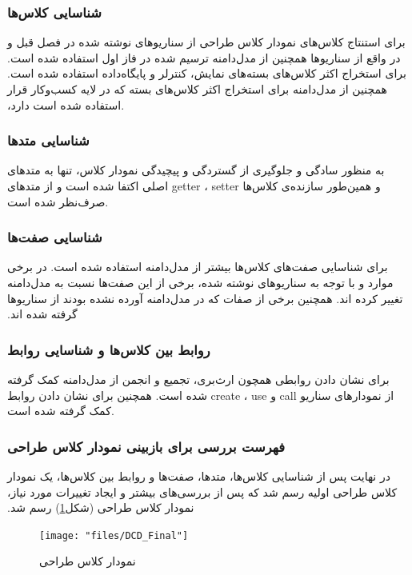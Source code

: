 \documentclass[12pt]{article}
\begin{document}
	\subsubsection{شناسایی کلاس‌ها}
	‫برای ‬‫استنتاج‬ ‫کلاس‬‌های‬‫ نمودار‬ ‫کلاس‬ ‫طراحی‬ ‫از‬ ‫سناریوهای‬ ‫نوشته‬ ‫شده‬ ‫در‬ ‫فصل‬ ‫قبل‬ ‫و‬ ‫همچنین‬ ‫از‬ ‫مدل‬‌‫دامنه ‬‫ترسیم‬ ‫شده‬ ‫در‬ ‫فاز‬ ‫اول‬ ‫استفاده‬ ‫شده‬ ‫است‪.‬‬ ‫در واقع‬ ‫از‬ ‫سناریوها‬ ‫برای‬ ‫استخراج‬ ‫اکثر‬ ‫کلاس‌های ‬‫بسته‬‌‫های‬ ‫نمایش‪،‬‬‫ کنترلر‬ ‫و‬ ‫پایگاه‌داده‬ ‫استفاده‬ ‫شده‬ ‫است‪.‬‬ ‫همچنین‬ ‫از‬ ‫مدل‬‌‫دامنه‬ ‫برای‬ ‫استخراج‬ ‫اکثر‬ کلاس‌های ‬‫بسته‬
	‫که‬‫ در‬ ‫لایه‬ ‫کسب‌و‬کار‬ ‫قرار‬ ‫دارد‪،‬‬ ‫استفاده‬ ‫شده‬ ‫است‬.
	\subsubsection{شناسایی متدها}
	به منظور سادگی و جلوگیری از گستردگی و پیچیدگی نمودار کلاس، تنها به متدهای اصلی اکتفا شده است و از متدهای
	getter ،
	setter
	و همین‌طور سازنده‌ی کلاس‌ها صرف‌نظر شده است.
	\subsubsection{شناسایی صفت‌ها}
	‫برای ‬‫شناسایی‬ ‫صفت‌های‬ ‫کلاس‌ها‬‫ بیشتر‬ ‫از‬ ‫مدل‌‫دامنه‬ ‫استفاده‬ ‫شده‬ ‫است‪.‬‬ ‫در‬ ‫برخی‬ ‫موارد‬ ‫و‬ ‫با‬ ‫توجه‬ ‫به سناریوهای ‬‫نوشته‬ ‫شده، برخی‬ ‫از‬ ‫این‬ ‫صفت‬‌‫ها ‬‫نسبت‬ ‫به‬ ‫مدل‬‌‫دامنه‬ ‫تغییر‬ ‫کرده‬ ‫اند‪.‬‬‫ همچنین‬ ‫برخی‬ ‫از‬ ‫صفات‬ که ‬‫در‬ ‫مدل‬‌‫دامنه‬ ‫آورده‬ ‫نشده‬ ‫بودند‬ ‫از‬ ‫سناریوها‬ ‫گرفته‬ ‫شده‬ ‫اند‬‫‪.‬‬
	\subsubsection{روابط بین کلاس‌ها و شناسایی روابط}
	برای نشان دادن روابطی همچون ارث‌بری، تجمیع و انجمن از مدل‌دامنه کمک گرفته شده است. همچنین برای نشان دادن روابط create ، use و call از نمودارهای سناریو کمک گرفته شده است.
	\subsubsection{فهرست بررسی برای بازبینی نمودار کلاس طراحی}
	در‬‫ نهایت‬ ‫پس‬ ‫از‬ ‫شناسایی‬ کلاس‌ها، متدها، ‫صفت‌ها‬‫ و ‫روابط‬ ‫بین‬ ‫کلاس‌ها،‬‫ یک نمودار ‫کلاس‬ ‫طراحی ‫اولیه‬ ‫رسم‬ ‫شد‬‫ که‬ ‫پس‬ ‫از‬ ‫بررسی‌های ‬‫بیشتر‬ ‫و‬ ‫ایجاد‬ ‫تغییرات‬ ‫مورد ‬‫نیاز، ‫نمودار‬ ‫کلاس‬ ‫طراحی‬ (شکل\ref{fig:class-diagram}) ‫رسم‬ ‫شد‬.‬‬\\
	\begin{figure}[H]
		\centering
		\texttt{[image: "files/DCD\_Final"]}
		\caption{نمودار کلاس طراحی}
		\label{fig:class-diagram}
	\end{figure}
\end{document}
